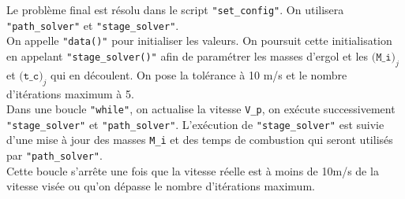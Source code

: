 Le problème final est résolu dans le script \texttt{"set\_config"}. On utilisera \texttt{"path\_solver"} et \texttt{"stage\_solver"}.\\
On appelle \texttt{"data()"} pour initialiser les valeurs. On poursuit cette initialisation en appelant \texttt{"stage\_solver()"} afin de paramétrer les masses d'ergol et les $\texttt{(M\_i)}_j$ et $\texttt{(t\_c)}_j$ qui en découlent. On pose la tolérance à 10 m/s et le nombre d'itérations maximum à 5.\\
Dans une boucle \texttt{"while"}, on actualise la vitesse \texttt{V\_p}, on exécute successivement \texttt{"stage\_solver"} et \texttt{"path\_solver"}. L'exécution de \texttt{"stage\_solver"} est suivie d'une mise à jour des masses \texttt{M\_i} et des temps de combustion qui seront utilisés par \texttt{"path\_solver"}.\\
Cette boucle s'arrête une fois que la vitesse réelle est à moins de 10m/s de la vitesse visée ou qu'on dépasse le nombre d'itérations maximum.